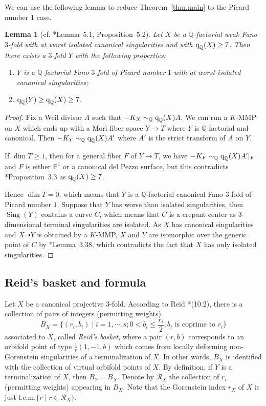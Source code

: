 \documentclass[12pt,twoside]{amsart}
\DeclareMathOperator{\Sing}{Sing}
\newcommand\lcm{{\text{l.c.m.}}}
\newcommand{\qQ}{\text{\rm q}_{\mathbb{Q}}}
\newtheorem{lem}[thm]{Lemma}
\theoremstyle{definition}
\begin{document}
We can use the following lemma to reduce Theorem~\ref{thm.main} to the Picard number $1$ case.
 
\begin{lem}[{cf. \cite{jiang-liu-liu}*{Lemma~5.1, Proposition~5.2}}]\label{lem.reducetopicard1}
    Let $X$ be a $\mathbb{Q}$-factorial weak Fano $3$-fold with at worst isolated canonical singularities and with $\qQ(X)\geq 7$. Then there exists a $3$-fold $Y$ with the following properties:
    \begin{enumerate}
        \item $Y$ is a $\mathbb Q$-factorial Fano $3$-fold of Picard number $1$ with at worst isolated canonical singularities;
        
        \item $\qQ(Y)\geq \qQ(X)\geq 7$.     
    \end{enumerate}
\end{lem}
\begin{proof}
    Fix a Weil divisor $A$ such that $-K_X \sim_{\mathbb Q}\qQ(X)A$. We can run a $K$-MMP on $X$ which ends up with a Mori fiber space $Y\to T$ where $Y$ is $\mathbb{Q}$-factorial and canonical. Then $-K_{Y}\sim_{\mathbb{Q}}\qQ(X) A'$ where $A'$ is the strict transform of $A$ on $Y$.
    
    If $\dim T\geq 1$, then for a general fiber $F$ of $Y\to T$, we have $-K_F\sim_{\mathbb{Q}}\qQ(X) A'|_F$ and $F$ is either $\mathbb{P}^1$ or a canonical del Pezzo surface, but this contradicts \cite{wang}*{Proposition~3.3}  as $\qQ(X)\geq 7$.
    
    Hence $\dim T=0$, which means that $Y$ is a $\mathbb Q$-factorial canonical Fano $3$-fold of Picard number $1$. Suppose that $Y$ has worse than isolated singularities, then $\Sing(Y)$ contains a curve $C$, which means that $C$ is a crepant center as $3$-dimensional terminal singularities are isolated. As $X$ has canonical singularities and $X\dashrightarrow Y$ is obtained by a $K$-MMP, $X$ and $Y$ are isomorphic over the generic point of $C$ by \cite{kollar-mori}*{Lemma~3.38}, which contradicts the fact that $X$ has only isolated singularities. 
\end{proof}


\subsection{Reid's basket and formula}

Let $X$ be a canonical projective $3$-fold. According to Reid \cite{reid}*{(10.2)}, there is a collection of pairs of integers (permitting weights)
\[
    B_{X}=\{(r_{i}, b_{i}) \mid i=1, \cdots, s ; 0<b_{i}\leq\frac{r_{i}}{2} ; b_{i} \text{ is coprime to } r_{i}\}
\]
associated to $X$, called {\it Reid's basket}, where a pair $(r, b)$ corresponds to an orbifold point of type $\frac{1}{r}(1, -1, b)$ which comes from locally deforming non-Gorenstein singularities of a terminalization of $X$. In other words, $B_X$ is identified with the collection of virtual orbifold points of $X$. By definition, if $Y$ is a terminalization of $X$, then $B_Y=B_X$. Denote by $\mathcal{R}_X$ the collection of $r_i$ (permitting weights) appearing in $B_X$. Note that the Gorenstein index $r_X$ of $X$ is just $\lcm\{r\mid r\in \mathcal{R}_X\}$.
\end{document}

